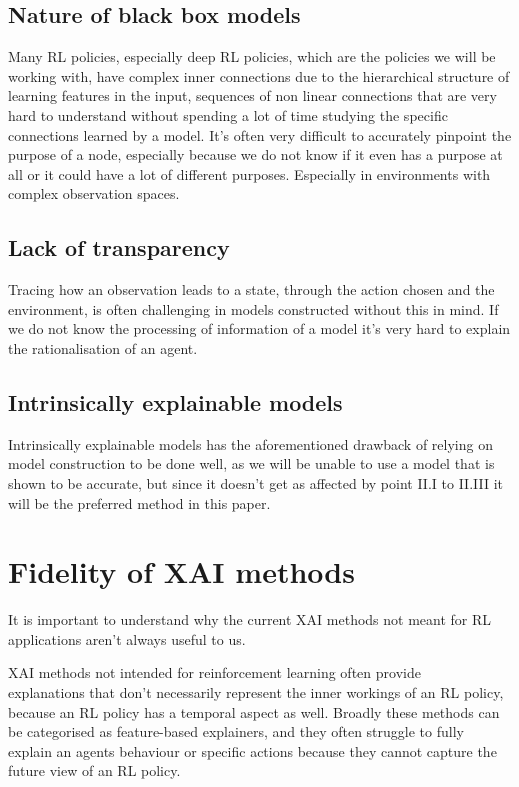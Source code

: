 \documentclass[UKenglish]{uiomasterthesis}
\begin{document}
\subsection{ Nature of black box models}
Many RL policies, especially deep RL policies, which are the policies we will be working with, have complex inner connections due to the hierarchical structure of learning features in the input, sequences of non linear connections that are very hard to understand without spending a lot of time studying the specific connections learned by a model. It's often very difficult to accurately pinpoint the purpose of a node, especially because we do not know if it even has a purpose at all or it could have a lot of different purposes. Especially in environments with complex observation spaces.


\subsection{ Lack of transparency}
Tracing how an observation leads to a state, through the action chosen and the environment, is often challenging in models constructed without this in mind. If we do not know the processing of information of a model it's very hard to explain the rationalisation of an agent.

\subsection{ Intrinsically explainable models}
Intrinsically explainable models has the aforementioned drawback of relying on model construction to be done well, as we will be unable to use a model that is shown to be accurate, but since it doesn't get as affected by point II.I to II.III it will be the preferred method in this paper.


\medskip

\section{Fidelity of XAI methods}
It is important to understand why the current XAI methods not meant for RL applications aren't always useful to us.

XAI methods not intended for reinforcement learning often provide\\ explanations that don't necessarily represent the inner workings of an RL policy, because an RL policy has a temporal aspect as well. Broadly these methods can be categorised as feature-based explainers, and they often struggle to fully explain an agents behaviour or specific actions because they cannot capture the future view of an RL policy. 
\end{document}
